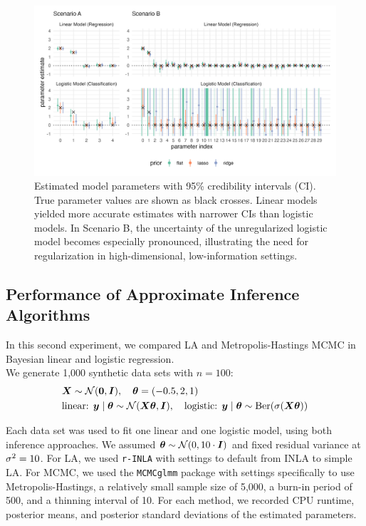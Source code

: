 \begin{figure}[htbp]
    \centering
    \includegraphics[width=\linewidth]{../figures/reg_all.png}
    \caption{Estimated model parameters with 95\% credibility intervals (CI).
    True parameter values are shown as black crosses.
    Linear models yielded more accurate estimates with narrower CIs than logistic models.
    In Scenario B, the uncertainty of the unregularized logistic model becomes especially pronounced, illustrating the need for regularization in high-dimensional, low-information settings.
    }
    \label{fig:reg-params}
\end{figure}

\subsection{Performance of Approximate Inference Algorithms}

In this second experiment, we compared LA and Metropolis-Hastings MCMC in Bayesian linear and logistic regression.\\

We generate 1,000 synthetic data sets with $n=100$:
\begin{equation*}
    \begin{aligned}
        &\bm{X} \sim \mathcal{N}(\bm{0}, \bm{I}), \quad \bm{\theta} = (-0.5, 2, 1)\\
        &\text{linear: } \bm{y} \mid \bm{\theta} \sim \mathcal{N}(\bm{X} \bm{\theta}, \bm{I}),\quad \text{logistic: } \bm{y} \mid \bm{\theta} \sim \text{Ber}(\sigma(\bm{X} \bm{\theta}))
    \end{aligned}
\end{equation*}

Each data set was used to fit one linear and one logistic model, using both inference approaches.
We assumed $\bm{\theta} \sim \mathcal{N}(0, 10 \cdot \bm{I})$ and fixed residual variance  at $\sigma^2 = 10$.
For LA, we used \texttt{r-INLA} \citep[][\url{ www.r-inla.org}]{rue_approximate_2009} with settings to default from INLA to simple LA.
For MCMC, we used the \texttt{MCMCglmm} package \citep{MCMCglmm_2010} with settings specifically to use Metropolis-Hastings, a relatively small sample size of 5,000, a burn-in period of 500, and a thinning interval of 10.
For each method, we recorded CPU runtime, posterior means, and posterior standard deviations of the estimated parameters.\\

